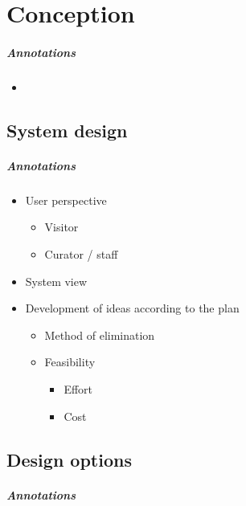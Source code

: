 \chapter{Conception}
\label{conception}

\paragraph{Annotations}

\begin{itemize}
	\item 
\end{itemize}



\section{System design}
\label{conception_system}

\paragraph{Annotations}

\begin{itemize}
	\item User perspective
	\begin{itemize}
		\item Visitor
		\item Curator / staff
	\end{itemize}
	\item System view
	\\
	\item Development of ideas according to the plan
	\begin{itemize}
		\item Method of elimination
		\item Feasibility
		\begin{itemize}
			\item Effort
			\item Cost
		\end{itemize}
	\end{itemize}
\end{itemize}



\section{Design options}
\label{conception_design}

\paragraph{Annotations}

